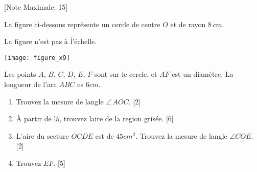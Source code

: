 \begin{question}
  \hspace*{\fill} [Note Maximale: 15]\par
  \noindent La figure ci-dessous représente un cercle de centre $O$ et de rayon $8\,cm$.\par
  \medskip
  \begin{center} %
    \noindent La figure n'est pas à ĺ'échelle.\par
    \texttt{[image: figure\_x9]}\par
  \end{center} %

  \noindent Les points $A$, $B$, $C$, $D$, $E$, $F$ sont sur le cercle, et $AF$ est un diamètre.  La longueur de l'arc $ABC$ es $6 cm$.\par
  \begin{enumerate}[label=(\alph*)]
    \item Trouvez la mesure de langle $\angle\,AOC$.\hspace*{\fill} [2]
    \item À partir de là, trouvez laire de la region grisée.\hspace*{\fill} [6]
    \item L'aire du secture $OCDE$ est de $45 cm^2$. Trouvez la mesure de langle $\angle COE$.\hspace*{\fill} [2]
    \item Trouvez $EF$.\hspace*{\fill} [5]
  \end{enumerate}
\end{question}

